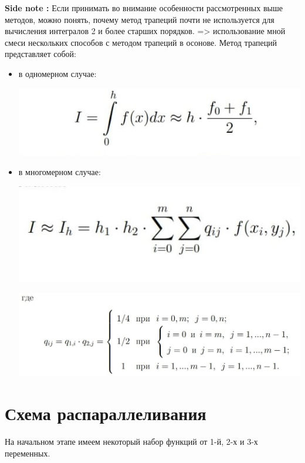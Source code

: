 \documentclass{report}
\begin{document}
\textbf{Side note : }  Если принимать во внимание особенности рассмотренных выше методов, можно понять, почему метод трапеций почти не используется для вычисления интегралов 2 и более старших порядков. => использование мной смеси нескольких способов с методом трапеций в осонове.
Метод трапеций представляет собой:
\begin{itemize}
\item в одномерном случае:
\begin{center}
\includegraphics[scale=0.8]{bur_img/onedim.jpg}
\end{center}
\item в многомерном случае:
\begin{center}
\includegraphics[scale=0.8]{bur_img/multidim.jpg}
\end{center}
\begin{center}
\includegraphics[scale=0.6]{bur_img/system.jpg}
\end{center}
\end{itemize}
\newpage

\section*{Схема распараллеливания}
\par На начальном этапе имеем некоторый набор функций от 1-й, 2-х и 3-х переменных.
\end{document}
